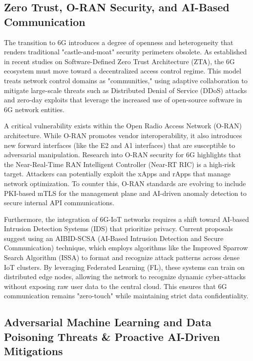 \documentclass[letterpaper]{article} %
\begin{document}

\subsection{Zero Trust, O-RAN Security, and AI-Based Communication}

The transition to 6G introduces a degree of openness and heterogeneity that renders traditional "castle-and-moat" security perimeters obsolete. As established in recent studies on Software-Defined Zero Trust Architecture (ZTA), the 6G ecosystem must move toward a decentralized access control regime. This model treats network control domains as "communities," using adaptive collaboration to mitigate large-scale threats such as Distributed Denial of Service (DDoS) attacks and zero-day exploits that leverage the increased use of open-source software in 6G network entities.

A critical vulnerability exists within the Open Radio Access Network (O-RAN) architecture. While O-RAN promotes vendor interoperability, it also introduces new forward interfaces (like the E2 and A1 interfaces) that are susceptible to adversarial manipulation. Research into O-RAN security for 6G highlights that the Near-Real-Time RAN Intelligent Controller (Near-RT RIC) is a high-risk target. Attackers can potentially exploit the xApps and rApps that manage network optimization. To counter this, O-RAN standards are evolving to include PKI-based mTLS for the management plane and AI-driven anomaly detection to secure internal API communications.

Furthermore, the integration of 6G-IoT networks requires a shift toward AI-based Intrusion Detection Systems (IDS) that prioritize privacy. Current proposals suggest using an AIBID-SCSA (AI-Based Intrusion Detection and Secure Communication) technique, which employs algorithms like the Improved Sparrow Search Algorithm (ISSA) to format and recognize attack patterns across dense IoT clusters. By leveraging Federated Learning (FL), these systems can train on distributed edge nodes, allowing the network to recognize dynamic cyber-attacks without exposing raw user data to the central cloud. This ensures that 6G communication remains "zero-touch" while maintaining strict data confidentiality.

\subsection{Adversarial Machine Learning and Data Poisoning Threats \& Proactive AI-Driven Mitigations}
\end{document}
